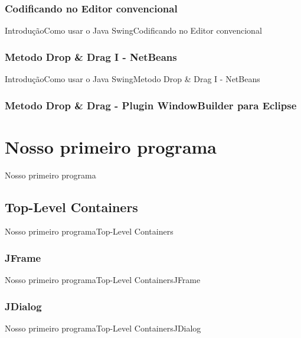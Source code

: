\documentclass[10pt]{beamer}
\begin{document}
\subsubsection{Codificando no Editor convencional}
\begin{frame}{Introdução}{Como usar o Java Swing}{Codificando no Editor convencional}

\end{frame}{}
\subsubsection{Metodo Drop \& Drag I - NetBeans}
\begin{frame}{Introdução}{Como usar o Java Swing}{Metodo Drop \& Drag I - NetBeans}
\end{frame}{}
\subsubsection{Metodo Drop \& Drag - Plugin WindowBuilder para Eclipse}
\begin{frame}
\end{frame}{}
			
\section{Nosso primeiro programa}
\begin{frame}{Nosso primeiro programa}{}
\end{frame}{}
\subsection{Top-Level Containers}
\begin{frame}{Nosso primeiro programa}{Top-Level Containers}
\end{frame}{}
\subsubsection{JFrame}
\begin{frame}{Nosso primeiro programa}{Top-Level Containers}{JFrame}
\end{frame}{}
\subsubsection{JDialog}
\begin{frame}{Nosso primeiro programa}{Top-Level Containers}{JDialog}
\end{frame}{}
\end{document}
